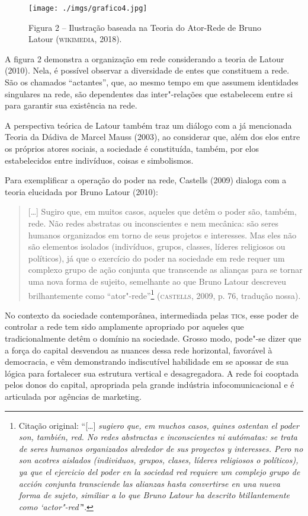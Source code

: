 \begin{figure}[!ht]
\texttt{[image: ./imgs/grafico4.jpg]}
\caption{Figura 2 -- Ilustração baseada na Teoria do Ator-Rede de Bruno Latour (\textsc{wikimedia}, 2018).}
\end{figure}

A figura 2 demonstra a organização em rede considerando a teoria de
Latour (2010). Nela, é possível observar a diversidade de entes que
constituem a rede. São os chamados ``actantes'', que, ao mesmo tempo em
que assumem identidades singulares na rede, são dependentes das
inter"-relações que estabelecem entre si para garantir sua existência na
rede.

A perspectiva teórica de Latour também traz um diálogo com a já
mencionada Teoria da Dádiva de Marcel Mauss (2003), ao considerar que,
além dos elos entre os próprios atores sociais, a sociedade é
constituída, também, por elos estabelecidos entre indivíduos, coisas e
simbolismos.

Para exemplificar a operação do poder na rede, Castells (2009) dialoga
com a teoria elucidada por Bruno Latour (2010):

\begin{quote}
[\ldots{}] Sugiro que, em muitos casos, aqueles que detêm o poder são,
também, rede. Não redes abstratas ou inconscientes e nem mecânica: são
seres humanos organizados em torno de seus projetos e interesses. Mas
eles não são elementos isolados (indivíduos, grupos, classes, líderes
religiosos ou políticos), já que o exercício do poder na sociedade em
rede requer um complexo grupo de ação conjunta que transcende as
alianças para se tornar uma nova forma de sujeito, semelhante ao que
Bruno Latour descreveu brilhantemente como ``ator"-rede''\footnote{Citação
  original: ``[\ldots{}] \emph{sugiero que, em muchos casos, quines ostentan el
        poder son, también, red. No redes abstractas e inconscientes ni
        autómatas: se trata de seres humanos organizados alrededor de sus
        proyectos y interesses. Pero no son acotres aislados (individuos,
        grupos, clases, líderes religiosos o políticos), ya que el ejercicio
        del poder en la sociedad red requiere um complejo grupo de acción
        conjunta transciende las alianzas hasta convertirse en una nueva forma
        de sujeto, similiar a lo que Bruno Latour ha descrito btillantemente
        como `actor"-red'}".} (\textsc{castells}, 2009, p. 76, tradução nossa).
\end{quote}

No contexto da sociedade contemporânea, intermediada pelas \textsc{tic}s, esse
poder de controlar a rede tem sido amplamente apropriado por aqueles que
tradicionalmente detêm o domínio na sociedade. Grosso modo, pode"-se
dizer que a força do capital desvendou as nuances dessa rede horizontal,
favorável à democracia, e vêm demonstrando indiscutível habilidade em se
apossar de sua lógica para fortalecer sua estrutura vertical e
desagregadora. A rede foi cooptada pelos donos do capital, apropriada
pela grande indústria infocomunicacional e é articulada por agências de
marketing.

